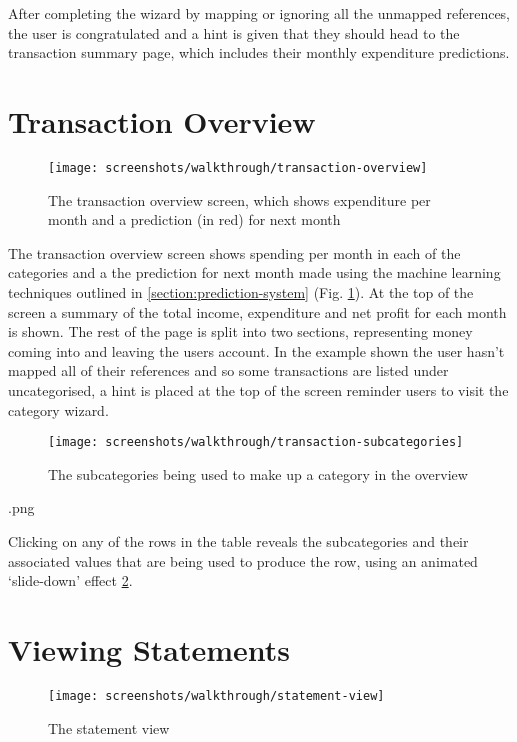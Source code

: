 After completing the wizard by mapping or ignoring all the unmapped references, the user is congratulated and a hint is given that they should head to the transaction summary page, which includes their monthly expenditure predictions.

\section{Transaction Overview}

\begin{figure}
\centering
\texttt{[image: screenshots/walkthrough/transaction-overview]}
\caption{The transaction overview screen, which shows expenditure per month and a prediction (in red) for next month}
\label{fig:transaction-overview}
\end{figure}

The transaction overview screen shows spending per month in each of the categories and a the prediction for next month made using the machine learning techniques outlined in \autoref{section:prediction-system} (Fig. \ref{fig:transaction-overview}). At the top of the screen a summary of the total income, expenditure and net profit for each month is shown. The rest of the page is split into two sections, representing money coming into and leaving the users account. In the example shown the user hasn't mapped all of their references and so some transactions are listed under uncategorised, a hint is placed at the top of the screen reminder users to visit the category wizard. 

\begin{figure}
\centering
\texttt{[image: screenshots/walkthrough/transaction-subcategories]}
\caption{The subcategories being used to make up a category in the overview}
\label{fig:transaction-subcategories}
\end{figure}
.png

Clicking on any of the rows in the table reveals the subcategories and their associated values that are being used to produce the row, using an animated `slide-down' effect \ref{fig:transaction-subcategories}. 

\section{Viewing Statements}
\begin{figure}
\centering
\texttt{[image: screenshots/walkthrough/statement-view]}
\caption{The statement view}
\label{fig:statement-view}
\end{figure}


